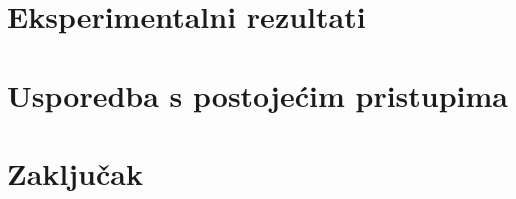\documentclass[conference]{IEEEtran}
\begin{document}
\section{Eksperimentalni rezultati}


\section{Usporedba s postojećim pristupima}


\section{Zaključak}


	
	
        \nocite{*}
\end{document}

